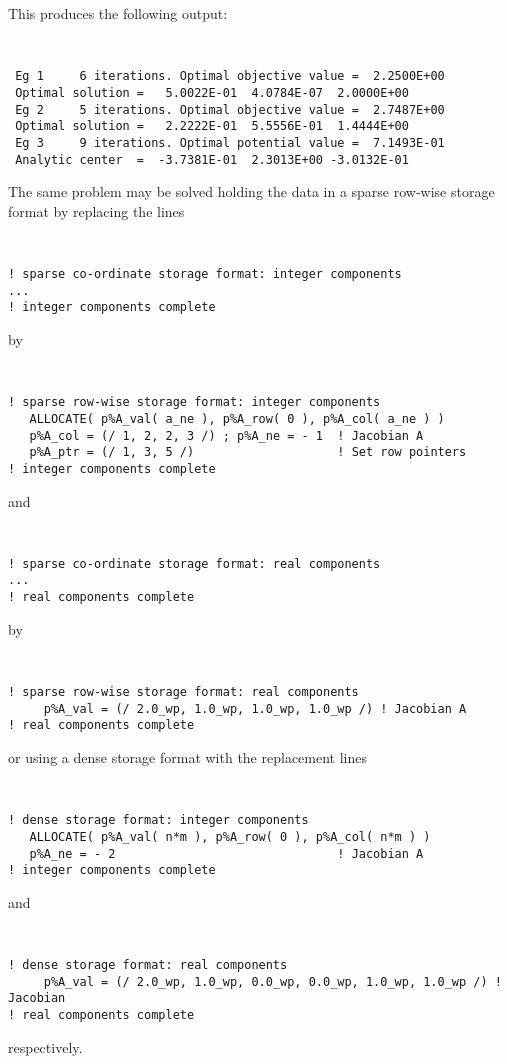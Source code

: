 \documentclass{galahad}
\begin{document}
\noindent
This produces the following output:
{\tt \small
\begin{verbatim}
 Eg 1     6 iterations. Optimal objective value =  2.2500E+00
 Optimal solution =   5.0022E-01  4.0784E-07  2.0000E+00
 Eg 2     5 iterations. Optimal objective value =  2.7487E+00
 Optimal solution =   2.2222E-01  5.5556E-01  1.4444E+00
 Eg 3     9 iterations. Optimal potential value =  7.1493E-01
 Analytic center  =  -3.7381E-01  2.3013E+00 -3.0132E-01
\end{verbatim}
}
\noindent
The same problem may be solved holding the data in 
a sparse row-wise storage format by replacing the lines
{\tt \small
\begin{verbatim}
! sparse co-ordinate storage format: integer components
...
! integer components complete 
\end{verbatim}
}
\noindent
by
{\tt \small
\begin{verbatim}
! sparse row-wise storage format: integer components
   ALLOCATE( p%A_val( a_ne ), p%A_row( 0 ), p%A_col( a_ne ) )
   p%A_col = (/ 1, 2, 2, 3 /) ; p%A_ne = - 1  ! Jacobian A
   p%A_ptr = (/ 1, 3, 5 /)                    ! Set row pointers  
! integer components complete
\end{verbatim}
}
\noindent
and
{\tt \small
\begin{verbatim}
! sparse co-ordinate storage format: real components
...
! real components complete   
\end{verbatim}
}
\noindent
by
{\tt \small
\begin{verbatim}
! sparse row-wise storage format: real components
     p%A_val = (/ 2.0_wp, 1.0_wp, 1.0_wp, 1.0_wp /) ! Jacobian A
! real components complete   
\end{verbatim}
}
\noindent
or using a dense storage format with the replacement lines
{\tt \small
\begin{verbatim}
! dense storage format: integer components
   ALLOCATE( p%A_val( n*m ), p%A_row( 0 ), p%A_col( n*m ) )
   p%A_ne = - 2                               ! Jacobian A
! integer components complete
\end{verbatim}
}
\noindent
and 
{\tt \small
\begin{verbatim}
! dense storage format: real components
     p%A_val = (/ 2.0_wp, 1.0_wp, 0.0_wp, 0.0_wp, 1.0_wp, 1.0_wp /) ! Jacobian
! real components complete   
\end{verbatim}
}
\noindent
respectively.
\end{document}
